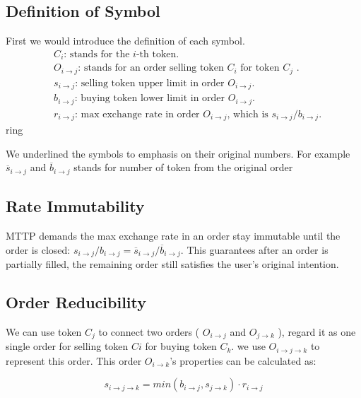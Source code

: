 \documentclass[UTF8,nofonts]{article}
\begin{document}
\subsection{Definition of Symbol}

First we would introduce the definition of each symbol.
\[
\begin{split}
&C_{i}\text{: \ }\text{stands for the $i$-th token.}\\
&O_{i\rightarrow j}\text{: \ }\text{stands for an order selling token $C_{i}$ for token $C_{j}$ .}\\
&s_{i\rightarrow j}\text{: \ }\text{selling token upper limit in order $O_{i\rightarrow j}$.}\\
&b_{i\rightarrow j}\text{: \ }\text{buying token lower limit in order $O_{i\rightarrow j}$.}\\
&r_{i\rightarrow j}\text{: \ }\text{max exchange rate in order $O_{i\rightarrow j}$, which is $s_{i\rightarrow j} / b_{i\rightarrow j}$.}
\end{split}
\]ring


We underlined the symbols to emphasis on their original numbers. For example $\overline{s}_{i\rightarrow j}$ and $\overline{b}_{i\rightarrow j}$ stands for number of token from the original order

\subsection{Rate Immutability\label{sec: consistrate}}

MTTP demands the max exchange rate in an order stay immutable until the order is closed: 
$s_{i\rightarrow j} / b_{i\rightarrow j} = \overline{s}_{i\rightarrow j}/ \overline{b}_{i\rightarrow j}$. This guarantees after an order is partially filled, the remaining order still satisfies the user's original intention.

\subsection{Order Reducibility\label{sec: reducibility}}


We can use token $C_j$ to connect two orders ( $O_{i\rightarrow j}$ and $O_{j\rightarrow k}$ ),  regard it as one single order for selling token $Ci$ for buying token $C_k$. we use $O_{i\rightarrow j\rightarrow k}$ to represent this order. This order $O_{i\rightarrow k}$'s properties can be calculated as: 

\begin{equation}
s_{i\rightarrow j\rightarrow k}=min(b_{i\rightarrow j}, s_{j\rightarrow k}) \cdot r_{i\rightarrow j}
\end{equation}
\end{document}

